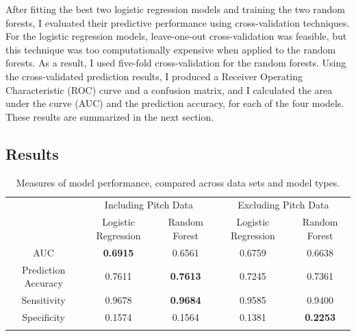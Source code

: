 \documentclass{article}
\begin{document}
After fitting the best two logistic regression models and training the two random forests, I evaluated their predictive performance using cross-validation techniques. For the logistic regression models, leave-one-out cross-validation was feasible, but this technique was too computationally expensive when applied to the random forests. As a result, I used five-fold cross-validation for the random forests. Using the cross-validated prediction results, I produced a Receiver Operating Characteristic (ROC) curve and a confusion matrix, and I calculated the area under the curve (AUC) and the prediction accuracy, for each of the four models. These results are summarized in the next section. 



\newpage
\begin{center}
    \section{Results}
\end{center}
    \begin{longtable}{c c c|c c}
        \toprule
        & \multicolumn{2}{c}{Including Pitch Data} & \multicolumn{2}{c}{Excluding Pitch Data} \\
        \cmidrule{2-3} \cmidrule{4-5}
        & Logistic Regression & Random Forest & Logistic Regression & Random Forest \\
        AUC & \textbf{0.6915} & 0.6561 & 0.6759 & 0.6638 \\
        Prediction Accuracy & 0.7611 & \textbf{0.7613} & 0.7245 & 0.7361 \\
        Sensitivity & 0.9678 & \textbf{0.9684} & 0.9585 & 0.9400 \\
        Specificity & 0.1574 & 0.1564 & 0.1381 & \textbf{0.2253} \\
        \bottomrule
        \caption{Measures of model performance, compared across data sets and model types.}
        \label{tab2_results}
    \end{longtable}
\end{document}
